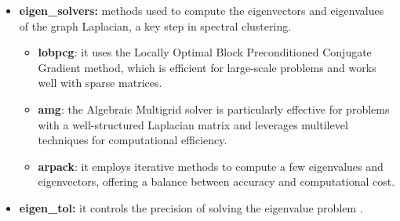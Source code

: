 \begin{itemize}
  \item \textbf{eigen\_solvers:} methods used to compute the eigenvectors and eigenvalues of the graph Laplacian,
  a key step in spectral clustering.
  \begin{itemize}
    \item \textbf{lobpcg}: it uses the Locally Optimal Block Preconditioned Conjugate Gradient method, which is efficient for 
    large-scale problems and works well with sparse matrices. 
    \item \textbf{amg}: the Algebraic Multigrid solver is particularly effective for problems with a well-structured 
    Laplacian matrix and leverages multilevel techniques for computational efficiency.
    \item \textbf{arpack}: it employs iterative methods to compute a few eigenvalues and eigenvectors, offering a
     balance between accuracy and computational cost.
\end{itemize}
  \item \textbf{eigen\_tol: } it controls the precision of solving the eigenvalue problem \cite{scikit-learn-spectralclustering}.
\end{itemize}



